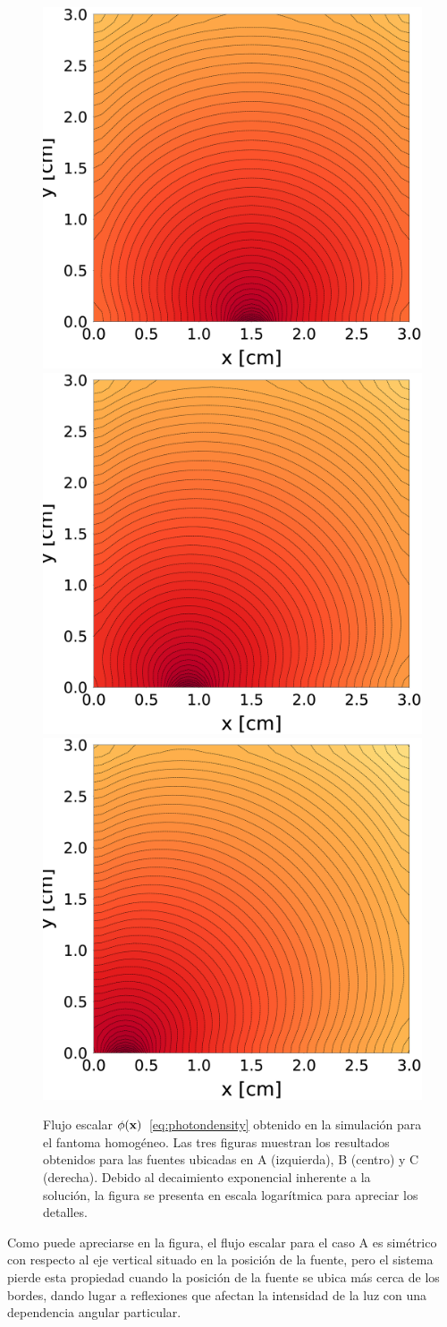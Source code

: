 \begin{figure}[h!]
\centering
  \includegraphics[width=0.32\linewidth]{figuras/ph1A.eps}
  \includegraphics[width=0.32\linewidth]{figuras/ph1B.eps}
  \includegraphics[width=0.32\linewidth]{figuras/ph1C.eps}
  \caption{
  Flujo escalar $\phi(\mathbf{x})$~\eqref{eq:photondensity} 
  obtenido en la simulación para el fantoma homogéneo. 
  Las tres figuras muestran los resultados obtenidos 
  para las fuentes ubicadas en A (izquierda), B (centro) y C (derecha). 
  Debido al decaimiento exponencial inherente a la solución, 
  la figura se presenta en escala logarítmica para apreciar los detalles.}
\label{fig:ph1timef}
\end{figure}
Como puede apreciarse en la figura, el flujo escalar para el caso A 
es simétrico con respecto al eje vertical situado en la posición 
de la fuente, pero el sistema pierde esta propiedad cuando la 
posición de la fuente se ubica más cerca de los bordes, 
dando lugar a reflexiones que afectan la intensidad 
de la luz con una dependencia angular particular.

